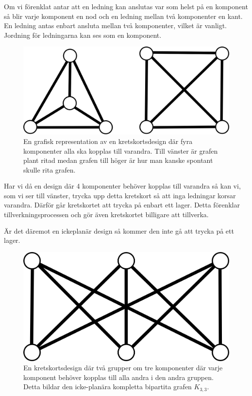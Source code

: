 \documentclass[a4paper,11pt]{article}
\begin{document}
Om vi förenklat antar att en ledning kan anslutas var som helst på en komponent så blir varje komponent en nod och en ledning mellan två komponenter en kant. En ledning antas enbart ansluta mellan två komponenter, vilket är vanligt. Jordning för ledningarna kan ses som en komponent.

\begin{figure}[!ht]
	\begin{center}
		\includegraphics{fig4}
		\caption{En grafisk representation av en kretskortsdesign där fyra komponenter alla ska kopplas till varandra. Till vänster är grafen plant ritad medan grafen till höger är hur man kanske spontant skulle rita grafen.}
		\label{fig4:2}
	\end{center}
\end{figure}
\FloatBarrier

Har vi då en design där 4 komponenter behöver kopplas till varandra så kan vi, som vi ser till vänster, trycka upp detta kretskort så att inga ledningar korsar varandra. Därför går kretskortet att trycka på enbart ett lager. Detta förenklar tillverkningsprocessen och gör även kretskortet billigare att tillverka.

Är det däremot en ickeplanär design så kommer den inte gå att trycka på ett lager.

\begin{figure}[!ht]
	\begin{center}
		\includegraphics{fig2}
		\caption{En kretskortsdesign där två grupper om tre komponenter där varje komponent behöver kopplas till alla andra i den andra gruppen. Detta bildar den icke-planära kompletta bipartita grafen $K_{3,3}$.}
		\label{fig2:2}
	\end{center}
\end{figure}
\FloatBarrier
\end{document}

